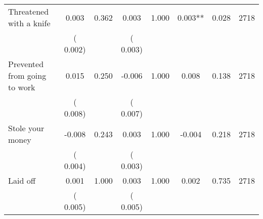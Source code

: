 \begin{tabular}{l*{7}{c}}
 Threatened with a knife       &              0.003       &        0.362  &              0.003       &        1.000  &              0.003**       &              0.028 &  2718 \\ 
                       &       (       0.002)             &                               &       (       0.003)                     &                               &                                               &                                &                      \\ 

 Prevented from going to work       &              0.015       &        0.250  &             -0.006       &        1.000  &              0.008       &              0.138 &  2718 \\ 
                       &       (       0.008)             &                               &       (       0.007)                     &                               &                                               &                                &                      \\ 

 Stole your money       &             -0.008       &        0.243  &              0.003       &        1.000  &             -0.004       &              0.218 &  2718 \\ 
                       &       (       0.004)             &                               &       (       0.003)                     &                               &                                               &                                &                      \\ 

 Laid off       &              0.001       &        1.000  &              0.003       &        1.000  &              0.002       &              0.735 &  2718 \\ 
                       &       (       0.005)             &                               &       (       0.005)                     &                               &                                               &                                &                      \\ 

\hline \end{tabular}